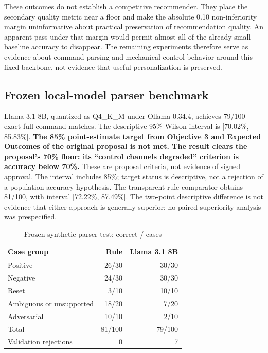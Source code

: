 \documentclass[conference]{IEEEtran}
\newcommand{\toprule}{\hline}
\newcommand{\midrule}{\hline}
\newcommand{\bottomrule}{\hline}
\begin{document}
These outcomes do not establish a competitive recommender. They place the secondary quality metric near a floor and make the absolute 0.10 non-inferiority margin uninformative about practical preservation of recommendation quality. An apparent pass under that margin would permit almost all of the already small baseline accuracy to disappear. The remaining experiments therefore serve as evidence about command parsing and mechanical control behavior around this fixed backbone, not evidence that useful personalization is preserved.

\subsection{Frozen local-model parser benchmark}
Llama 3.1 8B, quantized as Q4\_K\_M under Ollama 0.34.4, achieves 79/100 exact full-command matches. The descriptive 95\% Wilson interval is [70.02\%, 85.83\%]. \textbf{The 85\% point-estimate target from Objective 3 and Expected Outcomes of the original proposal is not met. The result clears the proposal's 70\% floor: its ``control channels degraded'' criterion is accuracy below 70\%.} These are proposal criteria, not evidence of signed approval. The interval includes 85\%; target status is descriptive, not a rejection of a population-accuracy hypothesis. The transparent rule comparator obtains 81/100, with interval [72.22\%, 87.49\%]. The two-point descriptive difference is not evidence that either approach is generally superior; no paired superiority analysis was prespecified.

\begin{table}[t]
\caption{Frozen synthetic parser test; correct / cases}
\label{tab:parser}
\centering\small
\begin{tabular}{@{}lrr@{}}
\toprule
Case group & Rule & Llama 3.1 8B\\\midrule
Positive & 26/30 & 30/30\\
Negative & 24/30 & 30/30\\
Reset & 3/10 & 10/10\\
Ambiguous or unsupported & 18/20 & 7/20\\
Adversarial & 10/10 & 2/10\\\midrule
Total & 81/100 & 79/100\\
Validation rejections & 0 & 7\\\bottomrule
\end{tabular}
\end{table}
\end{document}
